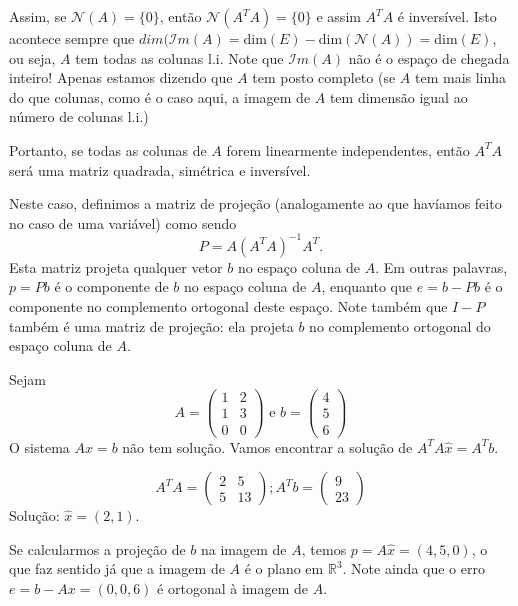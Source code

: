 Assim, se ${\mathcal{N}}(A) = \{ 0\}$, então ${\mathcal{N}}(A^TA) = \{0\}$ e assim $A^TA$ é inversível. Isto acontece sempre que $dim({\mathcal{I}}m(A) = $dim$(E)-$dim$({\mathcal{N}}(A)) = $dim$(E)$, ou seja, $A$ tem todas as colunas l.i.  Note que ${\mathcal{I}}m(A)$ não é o espaço de chegada inteiro! Apenas estamos dizendo que $A$ tem posto completo (se $A$ tem mais linha do que colunas, como é o caso aqui, a imagem de $A$ tem dimensão igual ao número de colunas l.i.)

Portanto, se todas as colunas de $A$ forem linearmente independentes, então $A^TA$ será uma matriz quadrada, simétrica e inversível.

Neste caso, definimos a matriz de projeção (analogamente ao que havíamos feito no caso de uma variável) como sendo
\begin{equation*}
   P = A(A^TA)^{-1}A^T.
\end{equation*}
Esta matriz projeta qualquer vetor $b$ no espaço coluna de $A$. Em outras palavras, $p=Pb$ é o componente de $b$ no espaço coluna de $A$, enquanto que $e=b-Pb$ é o componente no complemento ortogonal deste espaço. Note também que $I-P$ também é uma matriz de projeção: ela projeta $b$ no complemento ortogonal do espaço coluna de $A$.

\begin{exemplo*}
 	Sejam
     \begin{equation*}
     	A = \begin{pmatrix} 1 & 2\\1 & 3\\0 & 0\end{pmatrix} \text{ e } b = \begin{pmatrix} 4\\5\\6\end{pmatrix}
     \end{equation*}
     O sistema $Ax=b$ não tem solução. Vamos encontrar a solução de $A^TA\hat{x}=A^Tb$.
    
     \begin{equation*}
     	A^TA = \begin{pmatrix} 2 & 5\\5 & 13\end{pmatrix}; A^Tb = \begin{pmatrix} 9\\23\end{pmatrix}
     \end{equation*}
     Solução: $\hat{x} = (2,1)$.
    
     Se calcularmos a projeção de $b$ na imagem de $A$, temos $p=A\hat{x} = (4,5,0)$, o que faz sentido já que a imagem de $A$ é o plano em ${\mathbb{R}}^3$. Note ainda que o erro $e = b-Ax = (0,0,6)$ é ortogonal à imagem de $A$.
\end{exemplo*}

